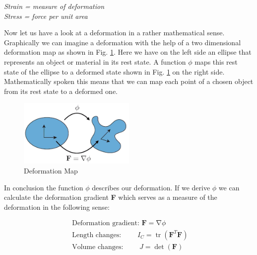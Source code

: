 \begin{addmargin}[2cm]{2cm}
\textit{Strain = measure of deformation}  \\
\textit{Stress = force per unit area} 
\end{addmargin}




Now let us have a look at a deformation in a rather mathematical sense. Graphically we can imagine a deformation with the help of a two dimensional deformation map as shown in Fig. \ref{fig:deformationmap}. Here we have on the left side an ellipse that represents an object or material in its rest state. A function $\phi$ maps this rest state of the ellipse to a deformed state shown in Fig. \ref{fig:deformationmap} on the right side. Mathematically spoken this means that we can map each point of a chosen object from its rest state to a deformed one.

\begin{figure}[!htbp]
	\centering
	\includegraphics[width=0.5\textwidth]{resources/deformation_map}
	\caption{Deformation Map {\cite{STREAM2018}}}
	\label{fig:deformationmap}
\end{figure}

In conclusion the function $\phi$ describes our deformation. If we derive $\phi$ we can calculate the deformation gradient \textbf{F} which serves as a measure of the deformation in the following sense: 

\[
\begin{array}{l}
{\text { Deformation gradient: }} {\mathbf{F}=\operatorname{\nabla} \phi}
\\
{\text { Length changes: }} {\qquad I_{C}=\operatorname{tr}\left(\mathbf{F}^{T} \mathbf{F}\right)} 
\\ 
{\text { Volume changes: }} {\qquad J=\operatorname{det}(\mathbf{F})}\end{array}
\]



